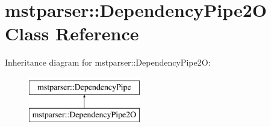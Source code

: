 \hypertarget{classmstparser_1_1DependencyPipe2O}{
\section{mstparser::DependencyPipe2O Class Reference}
\label{classmstparser_1_1DependencyPipe2O}
}
Inheritance diagram for mstparser::DependencyPipe2O:\begin{figure}[H]
\begin{center}
\leavevmode
\includegraphics[height=2cm]{classmstparser_1_1DependencyPipe2O}
\end{center}
\end{figure}

